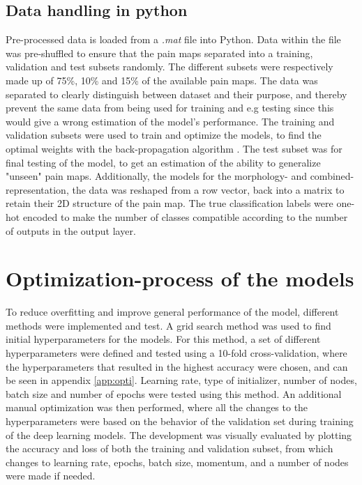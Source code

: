 \subsection{Data handling in python}
Pre-processed data is loaded from a \textit{.mat} file into Python.
Data within the file was pre-shuffled to ensure that the pain maps separated into a training, validation and test subsets randomly. The different subsets were respectively made up of 75\%, 10\% and 15\% of the available pain maps. The data was separated to clearly distinguish between dataset and their purpose, and thereby prevent the same data from being used for training and e.g testing since this would give a wrong estimation of the model’s performance.
The training and validation subsets were used to train and optimize the models, to find the optimal weights with the back-propagation algorithm \citep{Bengio2012}.
The test subset was for final testing of the model, to get an estimation of the ability to generalize "unseen" pain maps.
Additionally, the models for the morphology- and combined-representation, the data was reshaped from a row vector, back into a matrix to retain their 2D structure of the pain map.
The true classification labels were one-hot encoded to make the number of classes compatible according to the number of outputs in the output layer.

\section{Optimization-process of the models}
To reduce overfitting and improve general performance of the model, different methods were implemented and test.
A grid search method was used to find initial hyperparameters for the models. For this method, a set of different hyperparameters were defined and tested using a 10-fold cross-validation, where the hyperparameters that resulted in the highest accuracy were chosen, and can be seen in appendix \ref{app:opti}. Learning rate, type of initializer, number of nodes, batch size and number of epochs were tested using this method. 
An additional manual optimization was then performed, where all the changes to the hyperparameters were based on the behavior of the validation set during training of the deep learning models.
The development was visually evaluated by plotting the accuracy and loss of both the training and validation subset, from which changes to learning rate, epochs, batch size, momentum, and a number of nodes were made if needed.




